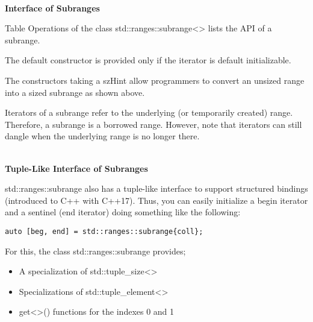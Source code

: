 \noindent
\hspace*{\fill} \\ %
\textbf{Interface of Subranges}

Table Operations of the class std::ranges::subrange<> lists the API of a subrange.

The default constructor is provided only if the iterator is default initializable.

The constructors taking a szHint allow programmers to convert an unsized range into a sized subrange as shown above.

Iterators of a subrange refer to the underlying (or temporarily created) range. Therefore, a subrange is a borrowed range. However, note that iterators can still dangle when the underlying range is no longer there.

\noindent
\hspace*{\fill} \\ %
\textbf{Tuple-Like Interface of Subranges}

std::ranges::subrange also has a tuple-like interface to support structured bindings (introduced to C++ with C++17). Thus, you can easily initialize a begin iterator and a sentinel (end iterator) doing something like the following:

\begin{lstlisting}[style=styleCXX]
auto [beg, end] = std::ranges::subrange{coll};
\end{lstlisting}

For this, the class std::ranges::subrange provides;

\begin{itemize}
\item
A specialization of std::tuple\_size<>

\item
Specializations of std::tuple\_element<>

\item
get<>() functions for the indexes 0 and 1
\end{itemize}

